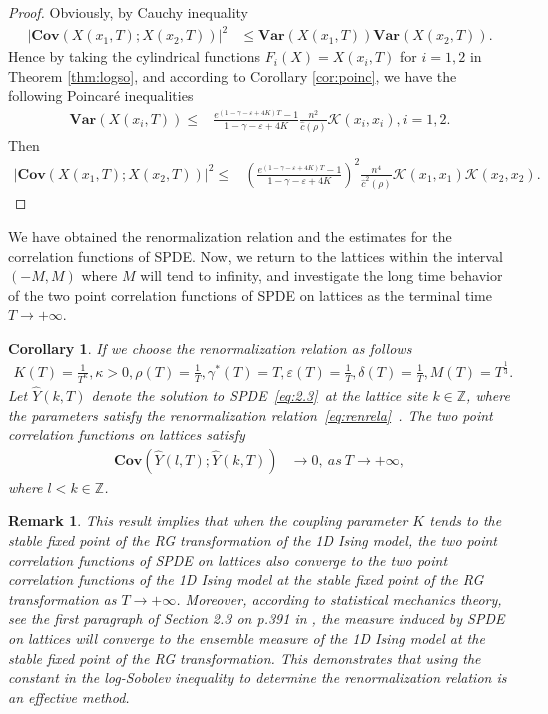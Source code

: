 \documentclass[11pt]{article}
\numberwithin{equation}{section}%
\numberwithin{figure}{section}%
\newtheorem{corollary}[theorem]{Corollary}
\newtheorem{remark}[theorem]{Remark}
\theoremstyle{remark}
\begin{document}
	\begin{proof}
		Obviously, by Cauchy inequality
		\begin{align*}
			\vert\textbf{Cov}(X(x_{1},T);X(x_{2},T))\vert^{2}&\leq\textbf{Var}(X(x_{1},T))\textbf{Var}(X(x_{2},T)).
		\end{align*}
		Hence by taking the cylindrical functions  $F_{i}(X)=X(x_{i},T)$ for $i=1,2$ in Theorem \ref{thm:logso}, and according to Corollary \ref{cor:poinc}, we have the following Poincar\'e inequalities 
		\begin{align*}
			\textbf{Var}(X(x_{i},T))
			\leq&\frac{e^{(1-\gamma-\varepsilon+4K)T}-1}{1-\gamma-\varepsilon+4K}\frac{n^{2}}{\hat{c}(\rho)}\mathcal{K}(x_{i},x_{i}),i=1,2.
		\end{align*}
		Then
			\begin{align*}
			\vert \textbf{Cov}(X(x_{1},T);X(x_{2},T))\vert^{2}\leq & \left(\frac{e^{(1-\gamma-\varepsilon+4K)T}-1}{1-\gamma-\varepsilon+4K}\right)^{2}\frac{n^{4}}{\hat{c}^{2}(\rho)}\mathcal{K}(x_{1},x_{1})\mathcal{K}(x_{2},x_{2}).
		\end{align*}
	\end{proof}
	We have obtained the renormalization relation and the estimates for the correlation functions of SPDE. Now, we return to the lattices within the interval $(-M,M)$ where $M$ will tend to infinity, and investigate the long time behavior of the two point correlation functions of SPDE on lattices as the terminal time $T\rightarrow+\infty$.
	\begin{corollary}
		If we choose the renormalization relation as follows
		\begin{align}\label{eq:renrela}
			K(T)=\frac{1}{T^{\kappa}},\kappa>0,
			\rho(T)=\frac{1}{T},\gamma^{*}(T)=T,
			\varepsilon(T)=\frac{1}{T},\delta(T)=\frac{1}{T},M(T)=T^{\frac{1}{3}}.
		\end{align}
		Let $\hat{Y}(k,T)$ denote the solution to SPDE~\eqref{eq:2.3}~at the lattice site $k\in\mathbb{Z}$, where the parameters satisfy the renormalization relation~\eqref{eq:renrela}~.
		The two point correlation functions on lattices satisfy
		\begin{align*}
			\textbf{Cov}(\hat{Y}(l,T);\hat{Y}(k,T))&\rightarrow 0,\ as\ T\rightarrow +\infty,
		\end{align*}
		where $l<k\in\mathbb{Z}$.
	\end{corollary}
	\begin{remark}
		This result implies that when the coupling parameter $K$ tends to the stable fixed point of the RG transformation of the 1D Ising model, the two point correlation functions of SPDE on lattices also converge to the two point correlation functions of the 1D Ising model at the stable fixed point of the RG transformation as $T\rightarrow+\infty$. Moreover, according to statistical mechanics theory, see the first paragraph of Section 2.3 on p.391 in \cite{Deligne1999document}, the measure induced by SPDE on lattices will converge to the ensemble measure of the 1D Ising model at the stable fixed point of the RG transformation. This demonstrates that using the constant in the log-Sobolev inequality to determine the renormalization relation is an effective method.
	\end{remark}
\end{document}
